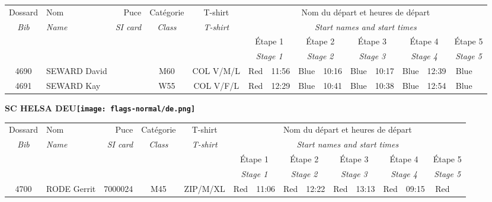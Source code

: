 \documentclass{report}
\begin{document}
  \begin{longtable}{|c|l|r|c|c|*{5}{cc|}}
    Dossard & Nom  & Puce    & Catégorie & T-shirt & \multicolumn{10}{c|}{Nom du départ et heures de départ} \\
    \itshape Bib     & \itshape Name & \itshape SI card & \itshape Class  & \itshape  T-shirt  & \multicolumn{10}{c|}{\itshape Start names and start times} \\
    \hline
    & & & & & \multicolumn{2}{c|}{Étape 1} & \multicolumn{2}{c|}{Étape 2} & \multicolumn{2}{c|}{Étape 3} & \multicolumn{2}{c|}{Étape 4} & \multicolumn{2}{c|}{Étape 5} \\
    & & & & & \multicolumn{2}{c|}{\itshape Stage 1} & \multicolumn{2}{c|}{\itshape Stage 2} & \multicolumn{2}{c|}{\itshape Stage 3} & \multicolumn{2}{c|}{\itshape Stage 4} & \multicolumn{2}{c|}{\itshape Stage 5} \\
    \hline
    4690 & SEWARD David &  & M60 & COL V/M/L & Red & 11:56 & Blue & 10:16 & Blue & 10:17 & Blue & 12:39 & Blue &  \\
    4691 & SEWARD Kay &  & W55 & COL V/F/L & Red & 12:29 & Blue & 10:41 & Blue & 10:38 & Blue & 12:54 & Blue &  \\
  \end{longtable}
\newpage
  \Huge \centering \bfseries SC HELSA  DEU\normalfont \footnotesize \sffamily \hfill \texttt{[image: flags-normal/de.png]} \newline 
  \begin{longtable}{|c|l|r|c|c|*{5}{cc|}}
    Dossard & Nom  & Puce    & Catégorie & T-shirt & \multicolumn{10}{c|}{Nom du départ et heures de départ} \\
    \itshape Bib     & \itshape Name & \itshape SI card & \itshape Class  & \itshape  T-shirt  & \multicolumn{10}{c|}{\itshape Start names and start times} \\
    \hline
    & & & & & \multicolumn{2}{c|}{Étape 1} & \multicolumn{2}{c|}{Étape 2} & \multicolumn{2}{c|}{Étape 3} & \multicolumn{2}{c|}{Étape 4} & \multicolumn{2}{c|}{Étape 5} \\
    & & & & & \multicolumn{2}{c|}{\itshape Stage 1} & \multicolumn{2}{c|}{\itshape Stage 2} & \multicolumn{2}{c|}{\itshape Stage 3} & \multicolumn{2}{c|}{\itshape Stage 4} & \multicolumn{2}{c|}{\itshape Stage 5} \\
    \hline
    4700 & RODE Gerrit & 7000024 & M45 & ZIP/M/XL & Red & 11:06 & Red & 12:22 & Red & 13:13 & Red & 09:15 & Red &  \\
  \end{longtable}
\end{document}
